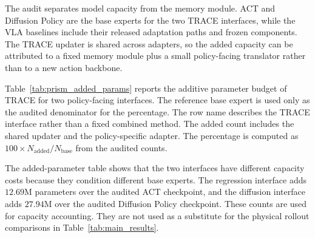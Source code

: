 \documentclass{article}
\begin{document}
The audit separates model capacity from the memory module. ACT and Diffusion Policy are the base experts for the two TRACE interfaces, while the VLA baselines include their released adaptation paths and frozen components. The TRACE updater is shared across adapters, so the added capacity can be attributed to a fixed memory module plus a small policy-facing translator rather than to a new action backbone.

Table~\ref{tab:prism_added_params} reports the additive parameter budget of TRACE for two policy-facing interfaces. The reference base expert is used only as the audited denominator for the percentage. The row name describes the TRACE interface rather than a fixed combined method. The added count includes the shared updater and the policy-specific adapter. The percentage is computed as $100\times N_{\mathrm{added}}/N_{\mathrm{base}}$ from the audited counts.

\begin{table}[H]
    \centering
    \caption{Additive TRACE parameter budget by policy-facing interface.}
    \label{tab:prism_added_params}
    \setlength{\tabcolsep}{2.8pt}
    \renewcommand{\arraystretch}{1.08}
\end{table}

The added-parameter table shows that the two interfaces have different capacity costs because they condition different base experts. The regression interface adds $12.69$M parameters over the audited ACT checkpoint, and the diffusion interface adds $27.94$M over the audited Diffusion Policy checkpoint. These counts are used for capacity accounting. They are not used as a substitute for the physical rollout comparisons in Table~\ref{tab:main_results}.
\end{document}
